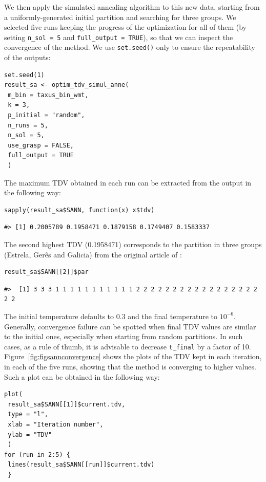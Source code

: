 We then apply the simulated annealing algorithm to this new data, starting from a uniformly-generated initial partition and searching for three groups. We selected five runs keeping the progress of the optimization for all of them (by setting \texttt{n\_sol\ =\ 5} and \texttt{full\_output\ =\ TRUE}), so that we can inspect the convergence of the method. We use \texttt{set.seed()} only to ensure the repeatability of the outputs:

\begin{verbatim}
set.seed(1)
result_sa <- optim_tdv_simul_anne(
 m_bin = taxus_bin_wmt,
 k = 3,
 p_initial = "random",
 n_runs = 5,
 n_sol = 5,
 use_grasp = FALSE,
 full_output = TRUE
 )
\end{verbatim}

The maximum TDV obtained in each run can be extracted from the output in the following way:

\begin{verbatim}
sapply(result_sa$SANN, function(x) x$tdv)
\end{verbatim}

\begin{verbatim}
#> [1] 0.2005789 0.1958471 0.1879158 0.1749407 0.1583337
\end{verbatim}

The second highest TDV (0.1958471) corresponds to the partition in three groups (Estrela, Gerês and Galicia) from the original article of \citet{PEMCFGFN21}:

\begin{verbatim}
result_sa$SANN[[2]]$par
\end{verbatim}

\begin{verbatim}
#>  [1] 3 3 3 1 1 1 1 1 1 1 1 1 1 1 2 2 2 2 2 2 2 2 2 2 2 2 2 2 2 2 2 2 2
\end{verbatim}

The initial temperature defaults to \(0.3\) and the final temperature to \(10^{-6}\). Generally, convergence failure can be spotted when final TDV values are similar to the initial ones, especially when starting from random partitions. In such cases, as a rule of thumb, it is advisable to decrease \texttt{t\_final} by a factor of 10. Figure~\ref{fig:figsannconvergence} shows the plots of the TDV kept in each iteration, in each of the five runs, showing that the method is converging to higher values. Such a plot can be obtained in the following way:

\begin{verbatim}
plot(
 result_sa$SANN[[1]]$current.tdv,
 type = "l",
 xlab = "Iteration number",
 ylab = "TDV"
 )
for (run in 2:5) {
 lines(result_sa$SANN[[run]]$current.tdv)
 }
\end{verbatim}

